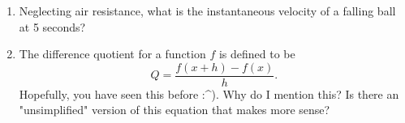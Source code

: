 \documentclass[letterpaper,11pt]{article}
\newif\ifsolutions
\begin{document}
\begin{enumerate}
\begin{enumerate}[label = \alph*.]
\begin{center}
\begin{tabular}{|p{2in}|p{2in}|}
                \hline
            \end{tabular}
        \end{center}
    \vfill
    \newpage
    \item Neglecting air resistance, what is the instantaneous velocity of a falling ball at 5 seconds?\\
    \ifsolutions \textcolor{blue} { 49 m/s } \fi
    \vfill
    \item The difference quotient for a function $f$ is defined to be
    \[Q = \frac{f(x+h) -f(x)}{h}.\]
    Hopefully, you have seen this before :\^{}). Why do I mention this? Is there an "unsimplified" version of this equation that makes more sense?\\
    \ifsolutions \textcolor{blue} { The difference quotient is the process in which the instantaneous velocity or tangent slopes are calculated. When $h\to 0$, we approach the instantaneous velocity or tangent slope exactly. } \fi
    \vfill
\end{enumerate}

\end{enumerate}
\end{document}
